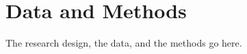 \section{Data and Methods}
\label{sec:design}

The research design, the data, and the methods go here.
